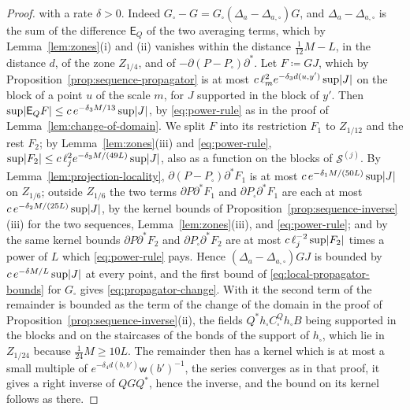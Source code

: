 \documentclass[11pt]{preprint}
\DeclarePairedDelimiter{\abs}{\lvert}{\rvert}
\numberwithin{equation}{section}
\theoremstyle{definition}
\theoremstyle{remark}
\theoremstyle{plain}
\begin{document}
\begin{proof}
with a rate $\delta > 0$. Indeed $G_\square - G = G_\square(\Delta_a - \Delta_{a,\square})G$, and $\Delta_a - \Delta_{a,\square}$ is the sum of the difference $\mathsf E_Q$ of the two averaging terms, which by Lemma~\ref{lem:zones}(i) and (ii) vanishes within the distance $\frac{1}{12}M - L$, in the distance $d$, of the zone $Z_{1/4}$, and of $-\partial(P - P_\square)\partial^*$. Let $F \coloneqq GJ$, which by Proposition~\ref{prop:sequence-propagator} is at most $c\,\ell_m^2e^{-\delta_3d(u, y')}\sup\abs J$ on the block of a point $u$ of the scale $m$, for $J$ supported in the block of $y'$. Then $\sup\abs{\mathsf E_QF} \leq c\,e^{-\delta_3M/13}\sup\abs J$, by \eqref{eq:power-rule} as in the proof of Lemma~\ref{lem:change-of-domain}. We split $F$ into its restriction $F_1$ to $Z_{1/12}$ and the rest $F_2$; by Lemma~\ref{lem:zones}(iii) and \eqref{eq:power-rule}, $\sup\abs{F_2} \leq c\,\ell_j^2e^{-\delta_3M/(49L)}\sup\abs J$, also as a function on the blocks of $\mathcal S^{(j)}$. By Lemma~\ref{lem:projection-locality}, $\partial(P - P_\square)\partial^*F_1$ is at most $c\,e^{-\delta_1M/(50L)}\sup\abs J$ on $Z_{1/6}$; outside $Z_{1/6}$ the two terms $\partial P\partial^*F_1$ and $\partial P_\square\partial^*F_1$ are each at most $c\,e^{-\delta_2M/(25L)}\sup\abs J$, by the kernel bounds of Proposition~\ref{prop:sequence-inverse}(iii) for the two sequences, Lemma~\ref{lem:zones}(iii), and \eqref{eq:power-rule}; and by the same kernel bounds $\partial P\partial^*F_2$ and $\partial P_\square\partial^*F_2$ are at most $c\,\ell_j^{-2}\sup\abs{F_2}$ times a power of $L$ which \eqref{eq:power-rule} pays. Hence $(\Delta_a - \Delta_{a,\square})GJ$ is bounded by $c\,e^{-\delta M/L}\sup\abs J$ at every point, and the first bound of \eqref{eq:local-propagator-bounds} for $G_\square$ gives \eqref{eq:propagator-change}. With it the second term of the remainder is bounded as the term of the change of the domain in the proof of Proposition~\ref{prop:sequence-inverse}(ii), the fields $Q^*h_\square C^Q_\square h_\square B$ being supported in the blocks and on the staircases of the bonds of the support of $h_\square$, which lie in $Z_{1/24}$ because $\frac{1}{24}M \geq 10L$. The remainder then has a kernel which is at most a small multiple of $e^{-\delta_4d(b, b')}\mathsf w(b')^{-1}$, the series converges as in that proof, it gives a right inverse of $QGQ^*$, hence the inverse, and the bound on its kernel follows as there.


\end{proof}
\end{document}
